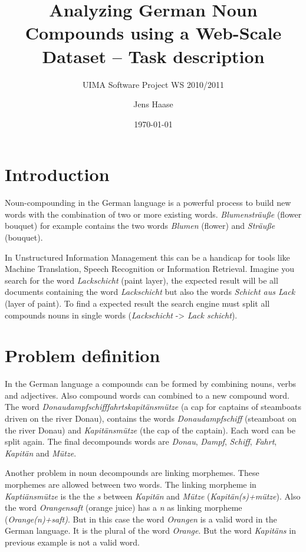 \documentclass[11pt, accentcolor=tud9b, nochapname]{tudexercise}
\begin{document}
\author{Jens Haase}
\title{Analyzing German Noun Compounds using a Web-Scale Dataset -- Task description}
\subtitle{UIMA Software Project WS 2010/2011}
\date{\today}
\maketitle

\section{Introduction}
Noun-compounding in the German language is a powerful process to build
new words with the combination of two or more existing
words. \emph{Blumensträuße} (flower bouquet) for example contains the
two words \emph{Blumen} (flower) and \emph{Sträuße} (bouquet).

In Unstructured Information Management this can be a handicap for
tools like Machine Translation, Speech Recognition or Information
Retrieval. Imagine you search for the word \emph{Lackschicht} (paint
layer), the expected result will be all documents containing the word
\emph{Lackschicht} but also the words \emph{Schicht aus Lack} (layer of
paint). To find a expected result the search engine must split all
compounds nouns in single words (\emph{Lackschicht} -> \emph{Lack schicht}).

\section{Problem definition}
In the German language a compounds can be formed by combining nouns,
verbs and adjectives. Also compound words can combined to a new
compound word. The word \emph{Donaudampfschifffahrtskapitänsmütze} (a
cap for captains of steamboats driven on the river Donau), contains the
words \emph{Donaudampfschiff} (steamboat on the river Donau) and
\emph{Kapitänsmütze} (the cap of the captain). Each word can be
split again. The final decompounds words are \emph{Donau},
\emph{Dampf}, \emph{Schiff}, \emph{Fahrt}, \emph{Kapitän} and
\emph{Mütze}.

Another problem in noun decompounds are linking morphemes. These
morphemes are allowed between two words. The linking morpheme in
\emph{Kaptiänsmütze} is the the \emph{s} between \emph{Kapitän} and
\emph{Mütze} (\emph{Kapitän(s)+mütze}). Also the word
\emph{Orangensaft} (orange juice) has a \emph{n} as linking morpheme
(\emph{Orange(n)+saft)}. But in this case the word \emph{Orangen} is a
valid word in the German language. It is the plural of the word
\emph{Orange}. But the word \emph{Kapitäns} in previous example is not
a valid word.
\end{document}
